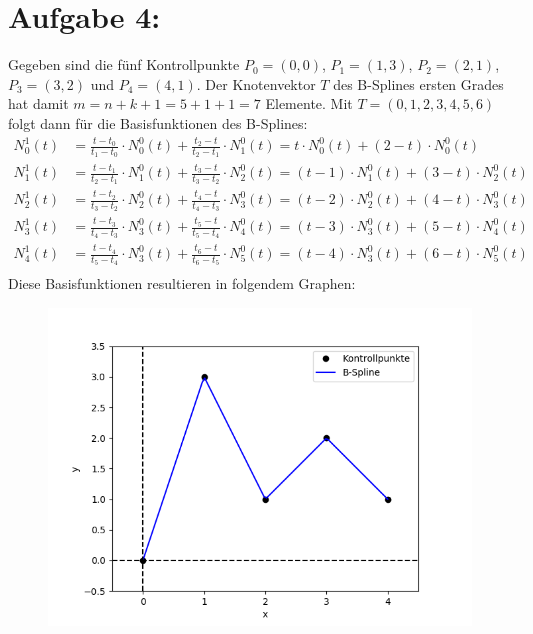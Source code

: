 \section*{Aufgabe 4: }
Gegeben sind die fünf Kontrollpunkte $P_0 = (0, 0)$, $P_1 = (1, 3)$, $P_2 = (2, 1)$, $P_3 = (3, 2)$ und $P_4 = (4, 1)$.
Der Knotenvektor $T$ des B-Splines ersten Grades hat damit $m = n + k + 1 = 5 + 1 + 1 = 7$ Elemente. Mit $T = (0, 1, 2, 3, 4, 5, 6)$ folgt dann für die Basisfunktionen des B-Splines:
\begin{align*}
  N_0^1(t) &= \frac{t - t_0}{t_1 - t_0}\cdot N_0^0(t) + \frac{t_2 - t}{t_2 - t_1}\cdot N_1^0(t) = t \cdot N_0^0(t) + (2 - t) \cdot N_0^0(t)\\
  N_1^1(t) &= \frac{t - t_1}{t_2 - t_1}\cdot N_1^0(t) + \frac{t_3 - t}{t_3 - t_2}\cdot N_2^0(t) = (t - 1) \cdot N_1^0(t) + (3 - t) \cdot N_2^0(t)\\
  N_2^1(t) &= \frac{t - t_2}{t_3 - t_2}\cdot N_2^0(t) + \frac{t_4 - t}{t_4 - t_3}\cdot N_3^0(t) = (t - 2) \cdot N_2^0(t) + (4 - t) \cdot N_3^0(t)\\
  N_3^1(t) &= \frac{t - t_3}{t_4 - t_3}\cdot N_3^0(t) + \frac{t_5 - t}{t_5 - t_4}\cdot N_4^0(t) = (t - 3) \cdot N_3^0(t) + (5 - t) \cdot N_4^0(t)\\
  N_4^1(t) &= \frac{t - t_4}{t_5 - t_4}\cdot N_3^0(t) + \frac{t_6 - t}{t_6 - t_5}\cdot N_5^0(t) = (t - 4) \cdot N_3^0(t) + (6 - t) \cdot N_5^0(t)\\
\end{align*}
Diese Basisfunktionen resultieren in folgendem Graphen:
\begin{center}
  \begin{figure}[H]
    \includegraphics[width=\textwidth, keepaspectratio]{splines}
  \end{figure}
\end{center}
